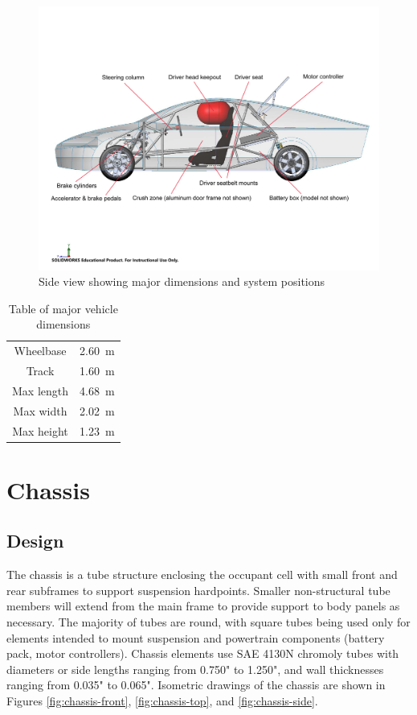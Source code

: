 \documentclass[10pt]{article}
\begin{document}
\begin{figure}
\centering
\includegraphics[width=\textwidth]{figures/msxii-side-view-annotated}
\caption{Side view showing major dimensions and system positions}
\label{fig:msxii-side-view-annotated}
\end{figure}

\begin{table}
\centering
\begin{tabular}{cc}
\toprule
Wheelbase    & \SI{2.60}{\metre}    \\
Track        & \SI{1.60}{\metre}    \\
Max length   & \SI{4.68}{\metre}    \\
Max width    & \SI{2.02}{\metre}    \\
Max height   & \SI{1.23}{\metre}    \\
\bottomrule
\end{tabular}
\caption{Table of major vehicle dimensions}
\label{tab:msxii-dimensions}
\end{table}

\section{Chassis}
\subsection{Design}
The chassis is a tube structure enclosing the occupant cell with small front and rear subframes to support suspension hardpoints. Smaller non-structural tube members will extend from the main frame to provide support to body panels as necessary. The majority of tubes are round, with square tubes being used only for elements intended to mount suspension and powertrain components (battery pack, motor controllers). Chassis elements use SAE 4130N chromoly tubes with diameters or side lengths ranging from 0.750" to 1.250", and wall thicknesses ranging from 0.035" to 0.065". Isometric drawings of the chassis are shown in Figures \ref{fig:chassis-front}, \ref{fig:chassis-top}, and \ref{fig:chassis-side}.
\end{document}
